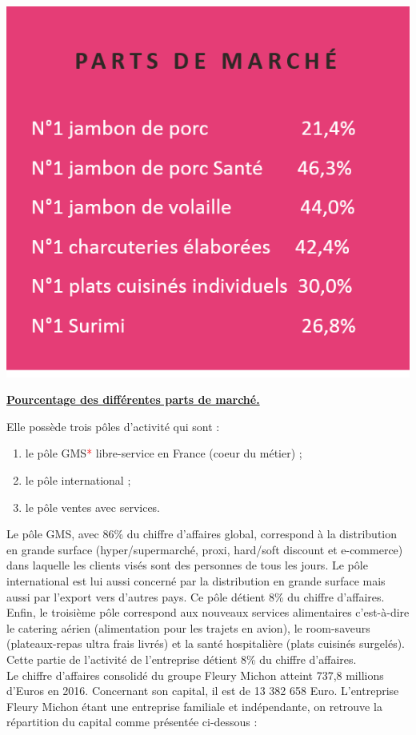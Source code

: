 \documentclass[a4paper,12pt]{extarticle}
\newcommand{\espace}{\vspace{0.3cm}}
\begin{document}
\centerline{\includegraphics[scale=0.6]{Img/Img_PartMarche.PNG}}
\centerline{\textbf{\underline{Pourcentage des différentes parts de marché.}}}
\espace{}

Elle possède trois pôles d’activité qui sont : 
\begin{enumerate}[-]
	\item le pôle GMS\textcolor{red}{*} libre-service en France (coeur du métier) ;
	\item le pôle international ;
	\item le pôle ventes avec services.
\end{enumerate}

Le pôle GMS, avec 86\% du chiffre d’affaires global, correspond à la distribution en grande surface (hyper/supermarché, proxi, hard/soft discount et e-commerce) dans laquelle les clients visés sont des personnes de tous les jours. Le pôle international est lui aussi concerné par la distribution en grande surface mais aussi par l’export vers d’autres pays. Ce pôle détient 8\% du chiffre d’affaires. Enfin, le troisième pôle correspond aux nouveaux services alimentaires c’est-à-dire le catering aérien (alimentation pour les trajets en avion), le room-saveurs (plateaux-repas ultra frais livrés) et la santé hospitalière (plats cuisinés surgelés). Cette partie de l’activité de l’entreprise détient 8\% du chiffre d’affaires.\\
Le chiffre d’affaires consolidé du groupe Fleury Michon atteint 737,8 millions d’Euros en 2016. Concernant son capital, il est de 13 382 658 Euro. L’entreprise Fleury Michon étant une entreprise familiale et indépendante, on retrouve la répartition du capital comme présentée ci-dessous : \\
\end{document}
